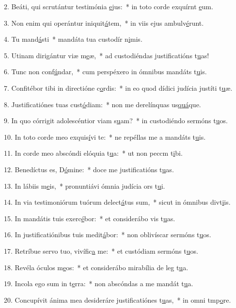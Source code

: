 2. Beáti, qui scrutántur testimónia \uline{e}jus:~* in toto corde exquírnt \uline{e}um.\par 
3. Non enim qui operántur iniquit\uline{á}tem,~* in viis ejus ambulv\uline{é}runt.\par 
4. Tu mand\uline{á}sti~* mandáta tua custodír n\uline{i}mis.\par 
5. Utinam dirigántur viæ m\uline{e}æ,~* ad custodiéndas justificatións t\uline{u}as!\par 
6. Tunc non conf\uline{ú}ndar,~* cum perspéxero in ómnibus mandáts t\uline{u}is.\par 
7. Confitébor tibi in directióne c\uline{o}rdis:~* in eo quod dídici judícia justíti t\uline{u}æ.\par 
8. Justificatiónes tuas cust\uline{ó}diam:~* non me derelínquas us\uline{quá}que.\par 
9. In quo córrigit adolescéntior viam s\uline{u}am?~* in custodiéndo sermóns t\uline{u}os.\par 
10. In toto corde meo exquis\uline{í}vi te:~* ne repéllas me a mandáts t\uline{u}is.\par 
11. In corde meo abscóndi elóquia t\uline{u}a:~* ut non peccm t\uline{i}bi.\par 
12. Benedíctus es, D\uline{ó}mine:~* doce me justificatións t\uline{u}as.\par 
13. In lábiis m\uline{e}is,~* pronuntiávi ómnia judícia ors t\uline{u}i.\par 
14. In via testimoniórum tuórum delect\uline{á}tus sum,~* sicut in ómnibus divt\uline{i}is.\par 
15. In mandátis tuis exerc\uline{é}bor:~* et considerábo vis t\uline{u}as.\par 
16. In justificatiónibus tuis medit\uline{á}bor:~* non oblivíscar sermóns t\uline{u}os.\par 
17. Retríbue servo tuo, vivífic\uline{a} me:~* et custódiam sermóns t\uline{u}os.\par 
18. Revéla óculos m\uline{e}os:~* et considerábo mirabília de leg t\uline{u}a.\par 
19. Incola ego sum in t\uline{e}rra:~* non abscóndas a me mandát t\uline{u}a.\par 
20. Concupívit ánima mea desideráre justificatiónes t\uline{u}as,~* in omni tmp\uline{o}re.\par 
